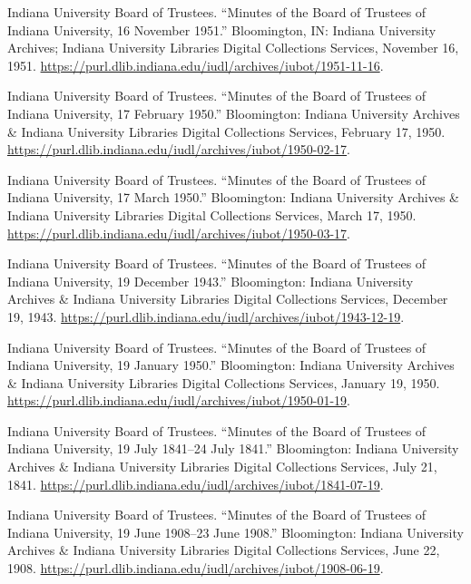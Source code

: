 \documentclass[
  american,
  letterpaper,
]{scrreprt}
\newlength{\cslhangindent}
\newenvironment{CSLReferences}[2] %
 {\begin{list}{}{%
  \setlength{\itemindent}{0pt}
  \setlength{\leftmargin}{0pt}
  \setlength{\parsep}{0pt}
  \ifodd #1
   \setlength{\leftmargin}{\cslhangindent}
   \setlength{\itemindent}{-1\cslhangindent}
  \fi
  \setlength{\itemsep}{#2\baselineskip}}}
 {\end{list}}
\begin{document}
\begin{CSLReferences}{1}{0}
Indiana University Board of Trustees. {``Minutes of the Board of
Trustees of Indiana University, 16 November 1951.''} Bloomington, IN:
Indiana University Archives; Indiana University Libraries Digital
Collections Services, November 16, 1951.
\url{https://purl.dlib.indiana.edu/iudl/archives/iubot/1951-11-16}.

Indiana University Board of Trustees. {``Minutes of the Board of
Trustees of Indiana University, 17 February 1950.''} Bloomington:
Indiana University Archives \& Indiana University Libraries Digital
Collections Services, February 17, 1950.
\url{https://purl.dlib.indiana.edu/iudl/archives/iubot/1950-02-17}.

Indiana University Board of Trustees. {``Minutes of the Board of
Trustees of Indiana University, 17 March 1950.''} Bloomington: Indiana
University Archives \& Indiana University Libraries Digital Collections
Services, March 17, 1950.
\url{https://purl.dlib.indiana.edu/iudl/archives/iubot/1950-03-17}.

Indiana University Board of Trustees. {``Minutes of the Board of
Trustees of Indiana University, 19 December 1943.''} Bloomington:
Indiana University Archives \& Indiana University Libraries Digital
Collections Services, December 19, 1943.
\url{https://purl.dlib.indiana.edu/iudl/archives/iubot/1943-12-19}.

Indiana University Board of Trustees. {``Minutes of the Board of
Trustees of Indiana University, 19 January 1950.''} Bloomington: Indiana
University Archives \& Indiana University Libraries Digital Collections
Services, January 19, 1950.
\url{https://purl.dlib.indiana.edu/iudl/archives/iubot/1950-01-19}.

Indiana University Board of Trustees. {``Minutes of the Board of
Trustees of Indiana University, 19 July 1841--24 July 1841.''}
Bloomington: Indiana University Archives \& Indiana University Libraries
Digital Collections Services, July 21, 1841.
\url{https://purl.dlib.indiana.edu/iudl/archives/iubot/1841-07-19}.

Indiana University Board of Trustees. {``Minutes of the Board of
Trustees of Indiana University, 19 June 1908--23 June 1908.''}
Bloomington: Indiana University Archives \& Indiana University Libraries
Digital Collections Services, June 22, 1908.
\url{https://purl.dlib.indiana.edu/iudl/archives/iubot/1908-06-19}.


\end{CSLReferences}
\end{document}
